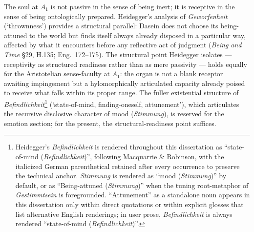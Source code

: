 The soul at $A_1$ is not passive in the sense of being inert; it is receptive in the sense of being ontologically prepared. Heidegger's analysis of \textit{Geworfenheit} (`thrownness') provides a structural parallel: Dasein does not choose its being-attuned to the world but finds itself always already disposed in a particular way, affected by what it encounters before any reflective act of judgment (\textit{Being and Time} \S 29, H.135; Eng.~172--175). The structural point Heidegger isolates --- receptivity as structured readiness rather than as mere passivity --- holds equally for the Aristotelian sense-faculty at $A_1$: the organ is not a blank receptor awaiting impingement but a hylomorphically articulated capacity already poised to receive what falls within its proper range. The fuller existential structure of \textit{Befindlichkeit}\footnote{Heidegger's \textit{Befindlichkeit} is rendered throughout this dissertation as ``state-of-mind (\textit{Befindlichkeit})'', following Macquarrie \& Robinson, with the italicized German parenthetical retained after every occurrence to preserve the technical anchor. \textit{Stimmung} is rendered as ``mood (\textit{Stimmung})'' by default, or as ``Being-attuned (\textit{Stimmung})'' when the tuning root-metaphor of \textit{Gestimmtsein} is foregrounded. ``Attunement'' as a standalone noun appears in this dissertation only within direct quotations or within explicit glosses that list alternative English renderings; in user prose, \textit{Befindlichkeit} is always rendered ``state-of-mind (\textit{Befindlichkeit})''.} (`state-of-mind, finding-oneself, attunement'), which articulates the recursive disclosive character of mood (\textit{Stimmung}), is reserved for the emotion section; for the present, the structural-readiness point suffices.

